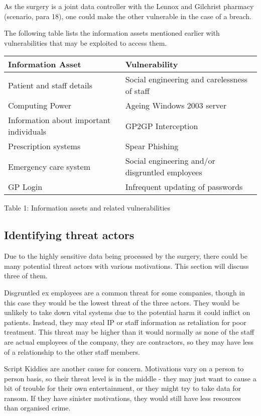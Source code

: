 \documentclass[12pt,a4paper]{article}
\begin{document}
As the surgery is a joint data controller with the Lennox and Gilchrist pharmacy (scenario, para 18), one could make the other vulnerable in the case of a breach.

The following table lists the information assets mentioned earlier with vulnerabilities that may be exploited to access them.

\begin{center}
\begin{tabular}{ |p{}|p{}| } 
 \hline
 \textbf{Information Asset} & \textbf{Vulnerability} \\ 
  \hline
 Patient and staff details & Social engineering and carelessness of staff\\ 
  \hline
 Computing Power & Ageing Windows 2003 server \\ 
 \hline
 Information about important individuals & GP2GP Interception \\ 
 \hline
 Prescription systems & Spear Phishing \\ 
 \hline
 Emergency care system & Social engineering and/or disgruntled employees \\ 
 \hline
 GP Login & Infrequent updating of passwords \\ 
 \hline
\end{tabular}
\caption{Table 1: Information assets and related vulnerabilities}
\end{center}

\subsection{Identifying threat actors}
Due to the highly sensitive data being processed by the surgery, there could be many potential threat actors with various motivations. This section will discuss three of them.

Disgruntled ex employees are a common threat for some companies, though in this case they would be the lowest threat of the three actors. They would be unlikely to take down vital systems due to the potential harm it could inflict on patients. Instead, they may steal IP or staff information as retaliation for poor treatment. This threat may be higher than it would normally as none of the staff are actual employees of the company, they are contractors, so they may have less of a relationship to the other staff members.

Script Kiddies are another cause for concern. Motivations vary on a person to person basis, so their threat level is in the middle - they may just want to cause a bit of trouble for their own entertainment, or they might try to take data for ransom. If they have sinister motivations, they would still have less resources than organised crime.
\end{document}
